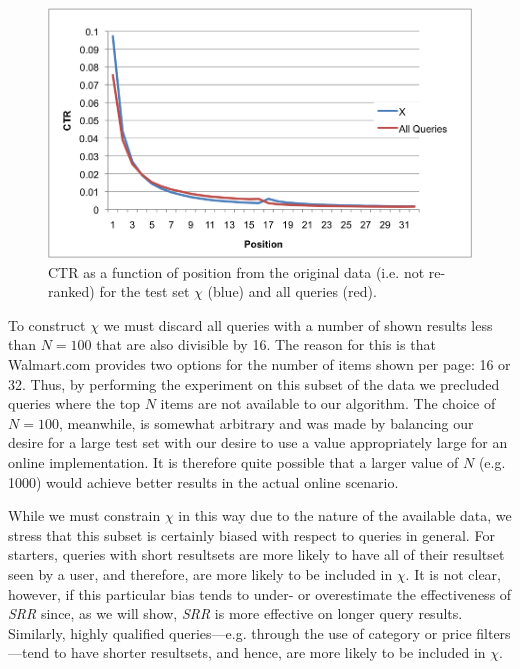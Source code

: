 \documentclass{article}
\begin{document}
\begin{figure}[htbp!]
    \centering
    \includegraphics[width=\textwidth]{CTRcompare.png}
    \caption{CTR as a function of position from the original data (i.e. not re-ranked) for the test set $\chi$ (blue) and all queries (red).}
    \label{fig:ctr_vs_position}
\end{figure}

To construct $\chi$ we  must discard all queries with a number of shown results
less than $N=100$ that are also divisible by 16. The reason for this is that
Walmart.com provides two options for the number of items shown per page: 16 or
32. Thus, by performing the experiment on this subset of the data we precluded
queries where the top $N$ items are not available to our algorithm.  The choice
of $N=100$, meanwhile, is somewhat arbitrary and was made by balancing our
desire for a large test set with our desire to use a value appropriately large
for an online implementation. It is therefore quite possible that a larger value
of $N$ (e.g. 1000) would achieve better results in the actual online scenario.

While we must constrain $\chi$ in this way due to the nature of the available
data, we stress that this subset is certainly biased with respect to queries in
general. For starters, queries with short resultsets are more likely to have all
of their resultset seen by a user, and therefore, are more likely to be included
in $\chi$. It is not clear, however, if this particular bias tends to under- or
overestimate the effectiveness of {\em SRR} since, as we will show, {\em SRR} is
more effective on longer query results. Similarly, highly qualified
queries---e.g. through the use of category or price filters---tend to have
shorter resultsets, and hence, are more likely to be included in $\chi$.
\end{document}
